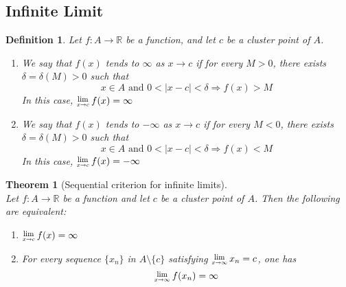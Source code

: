 \documentclass[12pt]{article}
\newcommand{\Lim}[1]{\raisebox{0.5ex}{\scalebox{0.8}{$\displaystyle \lim_{#1}\;$}}}
\newtheorem{definition}{Definition}[section]
\newtheorem{theorem}{Theorem}[section]
\theoremstyle{definition}
\begin{document}
\subsection{Infinite Limit}
\begin{definition}\normalfont Let $f:A\to\mathbb{R}$ be a function, and let $c$ be a cluster point of $A$.
\begin{enumerate}
\item We say that $f(x)$ tends to $\infty$ as $x\to c$ if for every $M>0$, there exists $\delta=\delta(M)>0$ such that
\[
x\in A\text{ and }0<|x-c|<\delta \Rightarrow f(x)>M
\]
In this case, $\Lim{x\to c}f(x)=\infty$
\item We say that $f(x)$ tends to $-\infty$ as $x\to c$ if for every $M<0$, there exists $\delta=\delta(M)>0$ such that
\[
x\in A\text{ and }0<|x-c|<\delta \Rightarrow f(x)<M
\]
In this case, $\Lim{x\to c}f(x)=-\infty$
\end{enumerate}
\end{definition}
\begin{theorem}[Sequential criterion for infinite limits]
\hfill\\\normalfont Let $f:A\to \mathbb{R}$ be a function and let $c$ be a cluster point of $A$. Then the following are equivalent:
\begin{enumerate}
\item $\Lim{x\to c}f(x)=\infty$
\item For every sequence $\{x_n\}$ in $A\setminus\{c\}$ satisfying $\Lim{x\to \infty}x_n=c$, one has
\[
\Lim{x\to \infty}f(x_n)=\infty
\]
\end{enumerate}
\end{theorem}
\end{document}
